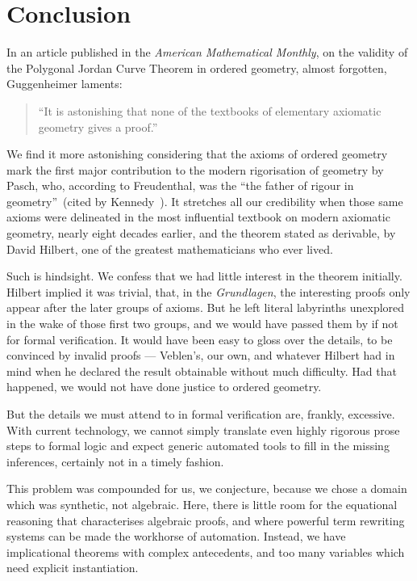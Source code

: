 \chapter{Conclusion}\label{chapter:Conclusion}
In an article published in the \emph{American Mathematical Monthly}, on the validity of the Polygonal Jordan Curve Theorem in ordered geometry, almost forgotten, Guggenheimer laments:
\begin{quote}``It is astonishing that none of the textbooks of elementary axiomatic geometry gives a proof.''
\end{quote}

We find it more astonishing considering that the axioms of ordered geometry mark the first major contribution to the modern rigorisation of geometry by Pasch, who, according to Freudenthal, was the ``the father of rigour in geometry''~(cited by Kennedy~\cite[p.~133]{ModernAxiomatics}). It stretches all our credibility when those same axioms were delineated in the most influential textbook on modern axiomatic geometry, nearly eight decades earlier,  and the theorem stated as derivable, by David Hilbert, one of the greatest mathematicians who ever lived.

Such is hindsight. We confess that we had little interest in the theorem initially. Hilbert implied it was trivial, that, in the \emph{Grundlagen}, the interesting proofs only appear after the later groups of axioms. But he left literal labyrinths unexplored in the wake of those first two groups, and we would have passed them by if not for formal verification. It would have been easy to gloss over the details, to be convinced by invalid proofs --- Veblen's, our own, and whatever Hilbert had in mind when he declared the result obtainable without much difficulty. Had that happened, we would not have done justice to ordered geometry.

But the details we must attend to in formal verification are, frankly, excessive. With current technology, we cannot simply translate even highly rigorous prose steps to formal logic and expect generic automated tools to fill in the missing inferences, certainly not in a timely fashion.

This problem was compounded for us, we conjecture, because we chose a domain which was synthetic, not algebraic. Here, there is little room for the equational reasoning that characterises algebraic proofs, and where powerful term rewriting systems can be made the workhorse of automation. Instead, we have implicational theorems with complex antecedents, and too many variables which need explicit instantiation.

